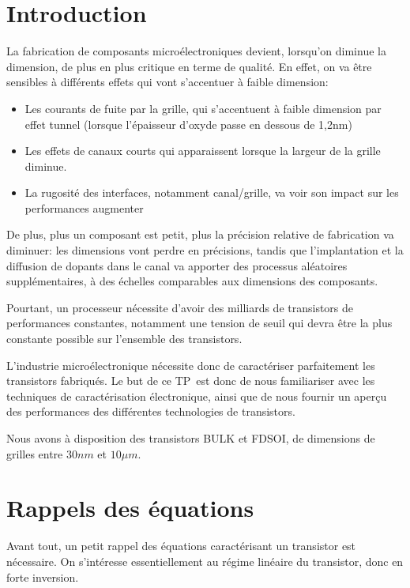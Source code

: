 \documentclass[a4paper,11pt]{report}
\begin{document}


\chapter*{Introduction}
La fabrication de composants microélectroniques devient, lorsqu'on diminue la dimension, de plus en plus critique en terme de qualité. En effet, on va être sensibles à différents effets qui vont s'accentuer à faible dimension:
\begin{itemize}
    \item Les courants de fuite par la grille, qui s'accentuent à faible dimension par effet tunnel (lorsque l'épaisseur d'oxyde passe en dessous de 1,2nm)
    \item Les effets de canaux courts qui apparaissent lorsque la largeur de la grille diminue.
    \item La rugosité des interfaces, notamment canal/grille, va voir son impact sur les performances augmenter
\end{itemize}

De plus, plus un composant est petit, plus la précision relative de fabrication va diminuer: les dimensions vont perdre en précisions, tandis que l'implantation et la diffusion de dopants dans le canal va apporter des processus aléatoires supplémentaires, à des échelles comparables aux dimensions des composants.

Pourtant, un processeur nécessite d'avoir des milliards de transistors de performances constantes, notamment une tension de seuil qui devra être la plus constante possible sur l'ensemble des transistors.

L'industrie microélectronique nécessite donc de caractériser parfaitement les transistors fabriqués. Le but de ce TP est donc de nous familiariser avec les techniques de caractérisation électronique, ainsi que de nous fournir un aperçu des performances des différentes technologies de transistors.

Nous avons à disposition des transistors BULK et FDSOI, de dimensions de grilles entre $30nm$ et $10\mu m$.

\chapter{Rappels des équations}

Avant tout, un petit rappel des équations caractérisant un transistor est nécessaire. On s'intéresse essentiellement au régime linéaire du transistor, donc en forte inversion.
\end{document}
